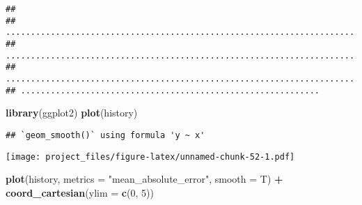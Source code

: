 \documentclass[
]{article}
\newenvironment{Shaded}{\begin{snugshade}}{\end{snugshade}}
\newcommand{\CharTok}[1]{\textcolor[rgb]{0.31,0.60,0.02}{#1}}
\newcommand{\ControlFlowTok}[1]{\textcolor[rgb]{0.13,0.29,0.53}{\textbf{#1}}}
\newcommand{\DataTypeTok}[1]{\textcolor[rgb]{0.13,0.29,0.53}{#1}}
\newcommand{\DecValTok}[1]{\textcolor[rgb]{0.00,0.00,0.81}{#1}}
\newcommand{\FloatTok}[1]{\textcolor[rgb]{0.00,0.00,0.81}{#1}}
\newcommand{\KeywordTok}[1]{\textcolor[rgb]{0.13,0.29,0.53}{\textbf{#1}}}
\newcommand{\NormalTok}[1]{#1}
\newcommand{\OperatorTok}[1]{\textcolor[rgb]{0.81,0.36,0.00}{\textbf{#1}}}
\newcommand{\StringTok}[1]{\textcolor[rgb]{0.31,0.60,0.02}{#1}}
\begin{document}
\begin{Shaded}
\end{Shaded}

\begin{verbatim}
## 
## ................................................................................
## ................................................................................
## ................................................................................
## ............................................................
\end{verbatim}

\begin{Shaded}
\begin{Highlighting}[]
\KeywordTok{library}\NormalTok{(ggplot2)}
\KeywordTok{plot}\NormalTok{(history)}
\end{Highlighting}
\end{Shaded}

\begin{verbatim}
## `geom_smooth()` using formula 'y ~ x'
\end{verbatim}

\texttt{[image: project\_files/figure-latex/unnamed-chunk-52-1.pdf]}

\begin{Shaded}
\begin{Highlighting}[]
\KeywordTok{plot}\NormalTok{(history, }\DataTypeTok{metrics =} \StringTok{"mean_absolute_error"}\NormalTok{, }\DataTypeTok{smooth =}\NormalTok{ T) }\OperatorTok{+}
\StringTok{  }\KeywordTok{coord_cartesian}\NormalTok{(}\DataTypeTok{ylim =} \KeywordTok{c}\NormalTok{(}\DecValTok{0}\NormalTok{, }\DecValTok{5}\NormalTok{))}
\end{Highlighting}
\end{Shaded}
\end{document}
